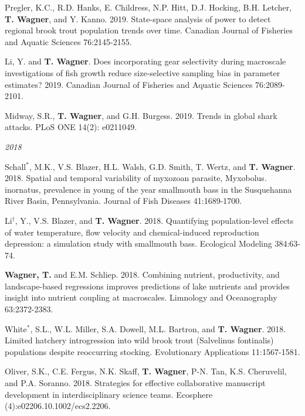 \documentclass[10pt]{article}
\begin{document}
\begin{flushleft}
\begin{etaremune}[start=91]
\item Pregler, K.C., R.D. Hanks, E. Childress, N.P. Hitt, D.J. Hocking, B.H. Letcher, \textbf{T. Wagner}, and Y. Kanno. 2019. State-space analysis of power to detect regional brook trout population trends over time. Canadian Journal of Fisheries and Aquatic Sciences 76:2145-2155.

\item Li, Y. and \textbf{T. Wagner}. Does incorporating gear selectivity during macroscale investigations of fish growth reduce size-selective sampling bias in parameter estimates? 2019. Canadian Journal of Fisheries and Aquatic Sciences 76:2089-2101.

\item Midway, S.R., \textbf{T. Wagner}, and G.H. Burgess. 2019. Trends in global shark attacks. PLoS ONE
14(2): e0211049.

\end{etaremune}

\emph{2018}
\begin{etaremune}[start=81]
\item Schall$^*$, M.K., V.S. Blazer, H.L. Walsh, G.D. Smith, T. Wertz, and \textbf{T. Wagner}. 2018. Spatial and temporal variability of myxozoan parasite, Myxobolus. inornatus, prevalence in young of the year smallmouth bass in the Susquehanna River Basin, Pennsylvania. Journal of Fish Diseases 41:1689-1700.

\item Li$^\dagger$, Y., V.S. Blazer, and \textbf{T. Wagner}. 2018. Quantifying population-level effects of water temperature, flow velocity and chemical-induced reproduction depression: a simulation study with smallmouth bass. Ecological Modeling 384:63-74.

\item {\bf Wagner, T.} and E.M. Schliep. 2018. Combining nutrient, productivity, and landscape-based regressions improves predictions of lake nutrients and provides insight into nutrient coupling at macroscales. Limnology and Oceanography 63:2372-2383.

\item White$^*$, S.L., W.L. Miller, S.A. Dowell, M.L. Bartron, and {\bf T. Wagner}.  2018. Limited hatchery introgression into wild brook trout (Salvelinus fontinalis) populations despite reoccurring stocking. Evolutionary Applications 11:1567-1581.

\item Oliver, S.K., C.E. Fergus, N.K. Skaff, {\bf T. Wagner}, P-N. Tan, K.S. Cheruvelil, and P.A. Soranno. 2018. Strategies for effective collaborative manuscript development in interdisciplinary science teams. Ecosphere (4):e02206.10.1002/ecs2.2206.


\end{etaremune}
\end{flushleft}
\end{document}
